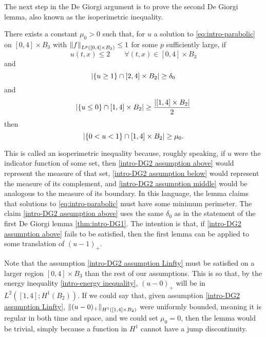The next step in the De Giorgi argument is to prove the second De Giorgi lemma, also known as the isoperimetric inequality.  
\begin{lemma} \label{thm:intro-DG2}
There exists a constant $\mu_0 > 0$ such that, for $u$ a solution to \eqref{eq:intro-parabolic} on $[0,4]\times B_3$ with $\left\lVert f\right\rVert_{L^p([0,4]\times B_3)} \leq 1$ for some $p$ sufficiently large, if
\begin{equation} \label{intro-DG2 assumption Linfty} u(t,x) \leq 2 \qquad \forall (t,x) \in [0,4] \times B_3 \end{equation}
and
\begin{equation} \label{intro-DG2 assumption above} \left\lvert \{u \geq 1\} \cap [2,4] \times B_2 \right\rvert \geq \delta_0 \end{equation}
and
\begin{equation} \label{intro-DG2 assumption below} \left\lvert \{u \leq 0\} \cap [1,4] \times B_2 \right\rvert \geq \frac{\left\lvert [1,4]\times B_2 \right\rvert}{2} \end{equation}
then
\begin{equation} \label{intro-DG2 assumption middle} \left\lvert \{0 < u < 1\} \cap [1,4] \times B_2 \right\rvert \geq \mu_0. \end{equation}
\end{lemma}

This is called an isoperimetric inequality because, roughly speaking, if $u$ were the indicator function of some set, then \eqref{intro-DG2 assumption above} would represent the measure of that set, \eqref{intro-DG2 assumption below} would represent the measure of its complement, and \eqref{intro-DG2 assumption middle} would be analogous to the measure of its boundary.  In this language, the lemma claims that solutions to \eqref{eq:intro-parabolic} must have some minimum perimeter.  The claim \eqref{intro-DG2 assumption above} uses the same $\delta_0$ as in the statement of the first De Giorgi lemma \ref{thm:intro-DG1}.  The intention is that, if \eqref{intro-DG2 assumption above} fails to be satisfied, then the first lemma can be applied to some translation of $(u-1)_+$.  

Note that the assumption \eqref{intro-DG2 assumption Linfty} must be satisfied on a larger region $[0,4]\times B_3$ than the rest of our assumptions.  This is so that, by the energy inequality \eqref{intro-energy inequality}, $(u-0)_+$ will be in $L^2([1,4]; H^1(B_2))$.  If we could say that, given assumption \eqref{intro-DG2 assumption Linfty}, $\left\lVert(u-0)_+\right\rVert_{H^1([1,4] \times B_2)}$ were uniformly bounded, meaning it is regular in both time and space, and we could set $\mu_0 = 0$, then the lemma would be trivial, simply because a function in $H^1$ cannot have a jump discontinuity.  

